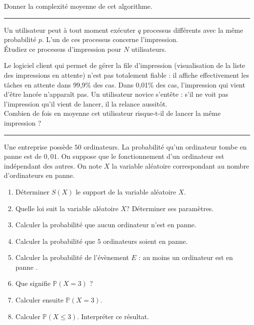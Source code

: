 \documentclass[../PolyS4.tex]{subfiles}
\begin{document}
 Donner la complexité moyenne de cet algorithme.\\
 
 \hfill\break
\hrule
\hfill\break


Un utilisateur peut à tout moment exécuter $q$ processus différents avec la même probabilité $p$. L'un de ces processus concerne l'impression.\\

 \' Etudiez ce processus d'impression pour $ N$ utilisateurs.\\

\newpage


Le logiciel client qui permet de gérer la file d'impression (visualisation de la liste des impressions en attente) n'est pas totalement fiable : il affiche effectivement les tâches en attente dans 99,9\% des cas. Dans 0,01\% des cas, l'impression qui vient d'être lancée n'apparaît pas. Un utilisateur novice s'entête : s'il ne voit pas l'impression qu'il vient de lancer, il la relance aussitôt. \\

Combien de fois en moyenne cet utilisateur risque-t-il de lancer la même impression ?\\


\hfill\break
\hrule
\hfill\break


Une entreprise possède $50$ ordinateurs. La probabilité qu'un ordinateur tombe en panne est de $0,01$. On suppose que le fonctionnement d'un ordinateur est indépendant des autres. On note $X$ la variable aléatoire correspondant au nombre d'ordinateurs en panne.\\

\begin{enumerate}
\item Déterminer $S(X)$ le support de la variable aléatoire $X$.
\item Quelle loi suit la variable aléatoire $ X $? Déterminer ses paramètres.
\item Calculer la probabilité que aucun ordinateur n'est en panne.
\item Calculer la probabilité que $5$ ordinateurs soient en panne. 
\item Calculer la probabilité de l'évènement $E$ : \og  au moins un ordinateur est en panne \fg{} .
\item Que signifie $\mathbb P (X = 3)$ ? 
\item Calculer ensuite $\mathbb P (X = 3)$.
\item Calculer $\mathbb P (X \leq 3)$. Interpréter ce résultat.\\
\end{enumerate}
\end{document}
